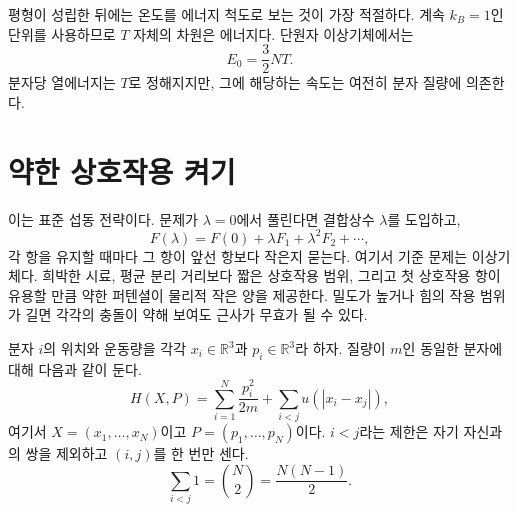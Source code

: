 \begin{classroomqa}
\end{classroomqa}

평형이 성립한 뒤에는 온도를 에너지 척도로 보는 것이 가장 적절하다. 계속 \(k_B=1\)인 단위를 사용하므로 \(T\) 자체의 차원은 에너지다. 단원자 이상기체에서는
\begin{equation}
 E_0=\frac{3}{2}NT.
 \label{eq:sm6-ideal-energy}
\end{equation}
분자당 열에너지는 \(T\)로 정해지지만, 그에 해당하는 속도는 여전히 분자 질량에 의존한다.

\section{약한 상호작용 켜기}

\begin{classroomqa}
\end{classroomqa}

이는 표준 섭동 전략이다. 문제가 \(\lambda=0\)에서 풀린다면 결합상수 \(\lambda\)를 도입하고,
\begin{equation}
 F(\lambda)=F(0)+\lambda F_1+\lambda^2F_2+\cdots,
 \label{eq:sm6-perturbative-template}
\end{equation}
각 항을 유지할 때마다 그 항이 앞선 항보다 작은지 묻는다. 여기서 기준 문제는 이상기체다. 희박한 시료, 평균 분리 거리보다 짧은 상호작용 범위, 그리고 첫 상호작용 항이 유용할 만큼 약한 퍼텐셜이 물리적 작은 양을 제공한다. 밀도가 높거나 힘의 작용 범위가 길면 각각의 충돌이 약해 보여도 근사가 무효가 될 수 있다.

분자 \(i\)의 위치와 운동량을 각각 \(x_i\in\mathbb R^3\)과 \(p_i\in\mathbb R^3\)라 하자. 질량이 \(m\)인 동일한 분자에 대해 다음과 같이 둔다.
\begin{equation}
 H(X,P)=
 \sum_{i=1}^{N}\frac{p_i^2}{2m}
 +\sum_{i<j}u\!\left(|x_i-x_j|\right),
 \label{eq:sm6-interacting-hamiltonian}
\end{equation}
여기서 \(X=(x_1,\ldots,x_N)\)이고 \(P=(p_1,\ldots,p_N)\)이다. \(i<j\)라는 제한은 자기 자신과의 쌍을 제외하고 \((i,j)\)를 한 번만 센다.
\begin{equation}
 \sum_{i<j}1=\binom{N}{2}=\frac{N(N-1)}{2}.
 \label{eq:sm6-pair-count}
\end{equation}

